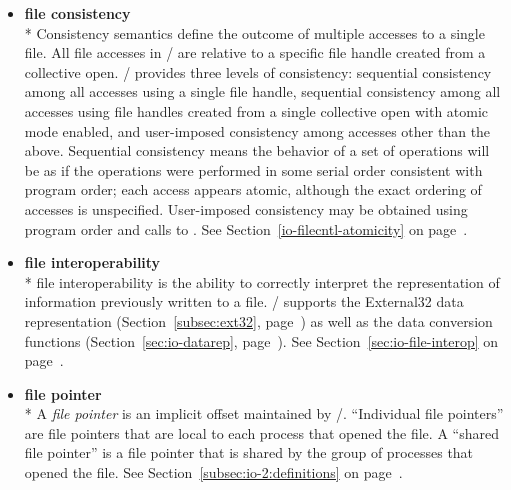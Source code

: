 \begin{itemize}
\label{glossary:file_consistency}
\item \textbf{ file consistency} \\*
Consistency semantics define the outcome of multiple accesses
to a single file.
All file accesses in \MPI/ are relative to a specific file handle
created from a collective open.
\MPI/ provides three levels of consistency:
sequential consistency among all accesses using a single file handle,
sequential consistency among all accesses
using file handles created from a single collective open
with atomic mode enabled,
and
user-imposed consistency among accesses other than the above.
Sequential consistency means the behavior of a set of operations
will be as if the operations were performed in some serial order
consistent with program order; each access appears atomic,
although the exact ordering of accesses is unspecified.
User-imposed consistency may be obtained using program order
and calls to .
See Section~\ref{io-filecntl-atomicity} on page~\pageref{io-filecntl-atomicity}.

\label{glossary:file_interoperability}
\item \textbf{ file interoperability} \\* 
file interoperability is the ability to
correctly interpret the representation of
 information previously written to a file.
\MPI/ supports the External32 data representation (Section~\ref{subsec:ext32}, page~\pageref{subsec:ext32}) as
well as the data conversion functions (Section~\ref{sec:io-datarep},
page~\pageref{sec:io-datarep}). 
See Section~\ref{sec:io-file-interop} on page~\pageref{sec:io-file-interop}.

\label{glossary:file_pointer}
\item \textbf{ file pointer} \\*
A {\it file pointer} is an implicit offset maintained by \MPI/.
``Individual file pointers'' are file pointers that are local to
each process that opened the file.
A ``shared file pointer'' is a file pointer that is shared by
the group of processes that opened the file.
See Section~\ref{subsec:io-2:definitions} on page~\pageref{subsec:io-2:definitions}.


\end{itemize}
